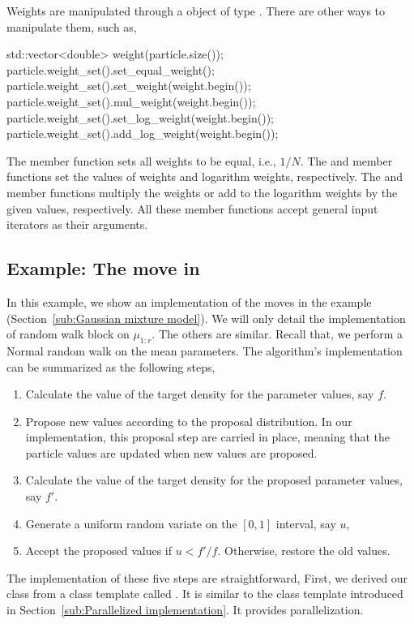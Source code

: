 Weights are manipulated through a object of type . There
are other ways to manipulate them, such as,
\begin{cppcode}
std::vector<double> weight(particle.size());
particle.weight_set().set_equal_weight();
particle.weight_set().set_weight(weight.begin());
particle.weight_set().mul_weight(weight.begin());
particle.weight_set().set_log_weight(weight.begin());
particle.weight_set().add_log_weight(weight.begin());
\end{cppcode}
The  member function sets all weights to be equal,
i.e., $1/N$. The  and  member
functions set the values of weights and logarithm weights, respectively. The
 and  member functions
multiply the weights or add to the logarithm weights by the given values,
respectively. All these member functions accept general input iterators as
their arguments.

\subsection{Example: The \protect\mcmc move in \protect\gmm}
\label{sub:Example: The mcmc move in gmm}

In this example, we show an implementation of the \mcmc moves in the \gmm
example (Section~\ref{sub:Gaussian mixture model}). We will only detail the
implementation of random walk block on $\mu_{1:r}$. The others are similar.
Recall that, we perform a Normal random walk on the mean parameters. The \mcmc
algorithm's implementation can be summarized as the following steps,
\begin{enumerate}
  \item Calculate the value of the target density for the parameter values,
    say $f$.
  \item Propose new values according to the proposal distribution. In our
    implementation, this proposal step are carried in place, meaning that the
    particle values are updated when new values are proposed.
  \item Calculate the value of the target density for the proposed parameter
    values, say $f'$.
  \item Generate a uniform random variate on the $[0,1]$ interval, say $u$,
  \item Accept the proposed values if $u < f'/f$. Otherwise, restore the old
    values.
\end{enumerate}
The implementation of these five steps are straightforward,
First, we derived our class from a class template called .
It is similar to the  class template introduced in
Section~\ref{sub:Parallelized implementation}. It provides \openmp
parallelization.

